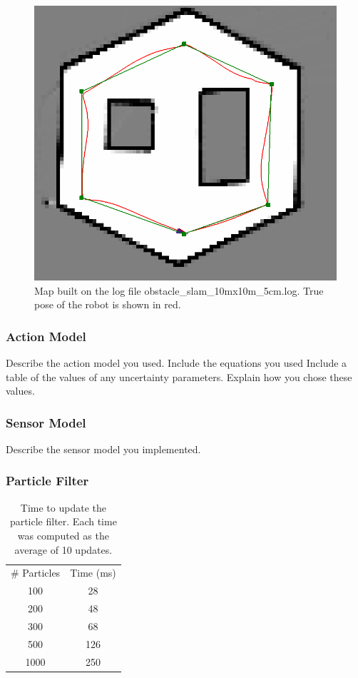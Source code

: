 \documentclass[journal]{IEEEtran}
\begin{document}
\begin{figure}[b]
    \centering
    \includegraphics[width=1\linewidth]{obstacle_slam_10mx10m_5cm-map.png}
    \caption{Map built on the log file obstacle\_slam\_10mx10m\_5cm.log. True pose of the robot is shown in red.}
    \label{fig:map}
\end{figure}


\subsubsection{Action Model}

Describe the action model you used.  Include the equations you used
Include a table of the values of any uncertainty parameters.  
Explain how you chose these values.
 \subsubsection{Sensor Model}

Describe the sensor model you implemented.

\subsubsection{Particle Filter}

\begin{table}[b]
    \centering
    \begin{tabular}{|c|c|} \hline
         \# Particles & Time (ms) \\
         100 & 28 \\ \hline
         200 & 48 \\ \hline
         300 & 68 \\ \hline
         500 & 126 \\ \hline
         1000 & 250 \\ \hline
    \end{tabular}
    \caption{Time to update the particle filter. Each time was computed as the average of 10 updates.}
    \label{tab:filter_perf}
\end{table}
\end{document}
